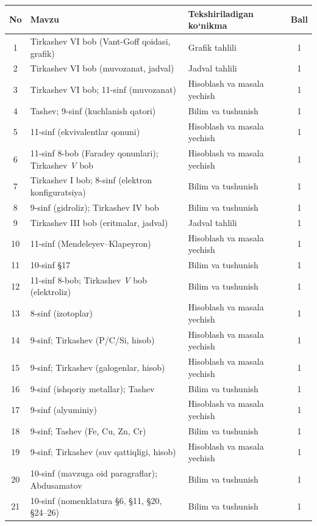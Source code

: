 \documentclass[11pt,a4paper]{article}
\begin{document}
{\small\noindent\begin{longtable}{|c|p{7.2cm}|p{5.4cm}|c|}\hline \textbf{No} & \textbf{Mavzu} & \textbf{Tekshiriladigan ko`nikma} & \textbf{Ball}\\\hline
1 & Tirkashev VI bob (Vant-Goff qoidasi, grafik) & Grafik tahlili & 1\\\hline
2 & Tirkashev VI bob (muvozanat, jadval) & Jadval tahlili & 1\\\hline
3 & Tirkashev VI bob; 11-sinf (muvozanat) & Hisoblash va masala yechish & 1\\\hline
4 & Tashev; 9-sinf (kuchlanish qatori) & Bilim va tushunish & 1\\\hline
5 & 11-sinf (ekvivalentlar qonuni) & Hisoblash va masala yechish & 1\\\hline
6 & 11-sinf 8-bob (Faradey qonunlari); Tirkashev \textit{V} bob & Hisoblash va masala yechish & 1\\\hline
7 & Tirkashev I bob; 8-sinf (elektron konfiguratsiya) & Bilim va tushunish & 1\\\hline
8 & 9-sinf (gidroliz); Tirkashev IV bob & Bilim va tushunish & 1\\\hline
9 & Tirkashev III bob (eritmalar, jadval) & Jadval tahlili & 1\\\hline
10 & 11-sinf (Mendeleyev--Klapeyron) & Hisoblash va masala yechish & 1\\\hline
11 & 10-sinf \S{}17 & Bilim va tushunish & 1\\\hline
12 & 11-sinf 8-bob; Tirkashev \textit{V} bob (elektroliz) & Bilim va tushunish & 1\\\hline
13 & 8-sinf (izotoplar) & Hisoblash va masala yechish & 1\\\hline
14 & 9-sinf; Tirkashev (P/C/Si, hisob) & Hisoblash va masala yechish & 1\\\hline
15 & 9-sinf; Tirkashev (galogenlar, hisob) & Hisoblash va masala yechish & 1\\\hline
16 & 9-sinf (ishqoriy metallar); Tashev & Bilim va tushunish & 1\\\hline
17 & 9-sinf (alyuminiy) & Hisoblash va masala yechish & 1\\\hline
18 & 9-sinf; Tashev (Fe, Cu, Zn, Cr) & Bilim va tushunish & 1\\\hline
19 & 9-sinf; Tirkashev (suv qattiqligi, hisob) & Hisoblash va masala yechish & 1\\\hline
20 & 10-sinf (mavzuga oid paragraflar); Abdusamatov & Bilim va tushunish & 1\\\hline
21 & 10-sinf (nomenklatura \S{}6, \S{}11, \S{}20, \S{}24--26) & Bilim va tushunish & 1\\\hline

\end{longtable}}
\end{document}
